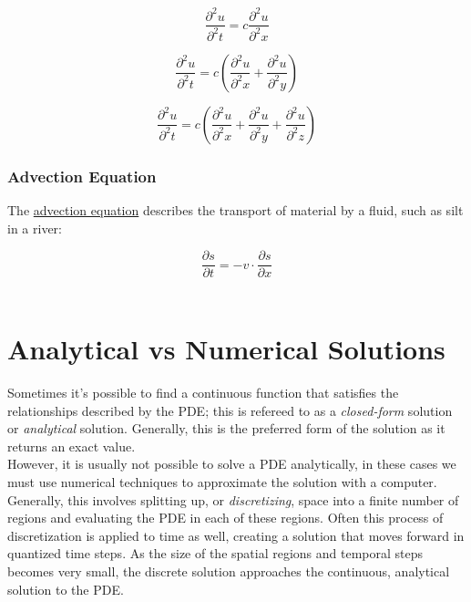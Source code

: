 { \begin{equation}\label{eq:wave1d}
  \frac{\partial^{2}u}{\partial^{2}t} = c\frac{\partial^{2}u}{\partial^{2}x}
  \end{equation}
  
   \begin{equation}\label{eq:wave2d}
  \frac{\partial^{2}u}{\partial^{2}t} = c\left(\frac{\partial^{2}u}{\partial^{2}x}+\frac{\partial^{2}u}{\partial^{2}y}\right)
  \end{equation}
  
   \begin{equation}\label{eq:wave3d}
  \frac{\partial^{2}u}{ \partial^{2}t} = c\left(\frac{\partial^{2}u}{\partial^{2}x}+\frac{\partial^{2}u}{\partial^{2}y}+\frac{\partial^{2}u}{\partial^{2}z} \right)
  \end{equation}
    
  \subsubsection{Advection Equation}
  
  The \href{https://en.wikipedia.org/wiki/Advection}{advection equation} describes the transport of material by a fluid, such as silt in a river:
  
   \begin{equation}\label{eq:advection}
  \frac{\partial s}{\partial t} = -v \cdot \frac{\partial s}{\partial x}
  \end{equation}
   \\
\section{Analytical vs Numerical Solutions}

Sometimes it's possible to find a continuous function that satisfies the relationships described by the PDE; this is refereed to as a \textit{closed-form} solution or \textit{analytical} solution.  Generally, this is the preferred form of the solution as it returns an exact value.\\

However, it is usually not possible to solve a PDE analytically, in these cases we must use numerical techniques to approximate the solution with a computer.  Generally, this involves splitting up, or \textit{discretizing}, space into a finite number of regions and evaluating the PDE in each of these regions.  Often this process of discretization is applied to time as well, creating a solution that moves forward in quantized time steps.  As the size of the spatial regions and temporal steps becomes very small, the discrete solution approaches the continuous, analytical solution to the PDE.

}
